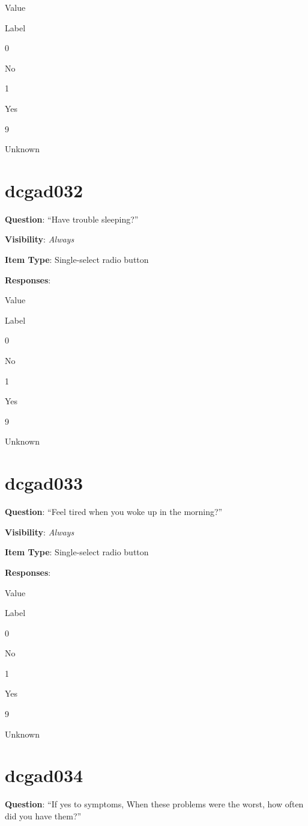 \documentclass[]{book}
\begin{document}
Value

Label

0

No

1

Yes

9

Unknown

\hypertarget{dcgad032}{%
\section{dcgad032}\label{dcgad032}}

\textbf{Question}: ``Have trouble sleeping?''

\textbf{Visibility}: \emph{Always}

\textbf{Item Type}: Single-select radio button

\textbf{Responses}:

Value

Label

0

No

1

Yes

9

Unknown

\hypertarget{dcgad033}{%
\section{dcgad033}\label{dcgad033}}

\textbf{Question}: ``Feel tired when you woke up in the morning?''

\textbf{Visibility}: \emph{Always}

\textbf{Item Type}: Single-select radio button

\textbf{Responses}:

Value

Label

0

No

1

Yes

9

Unknown

\hypertarget{dcgad034}{%
\section{dcgad034}\label{dcgad034}}

\textbf{Question}: ``If yes to symptoms, When these problems were the worst, how often did you have them?''
\end{document}
